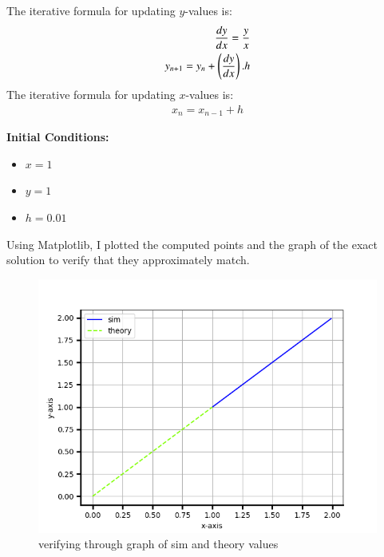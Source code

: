\documentclass[article]{IEEEtran}
\numberwithin{figure}{enumi}
\begin{document}
\noindent The iterative formula for updating $y$-values is:  
\begin{align}
    \frac{dy}{dx}=\frac{y}{x}\\
    y_{n+1}=y_n+\left(\frac{dy}{dx}\right).h
\end{align}
The iterative formula for updating $x$-values is: 
\begin{align}
    x_n=x_{n-1}+h
\end{align} 

\noindent\textbf{Initial Conditions:}  
\begin{itemize}
    \item $x = 1$  
    \item $y = 1$  
    \item $h = 0.01$  
\end{itemize}

Using Matplotlib, I plotted the computed points and the graph of the exact solution to verify that they approximately match.
\begin{figure}[h!]
	\centering
	\includegraphics[width=\columnwidth]{figs/problem2.png}
	\caption{verifying through graph of sim and theory values}
	\label{stemplot}
\end{figure}	
\end{document}
